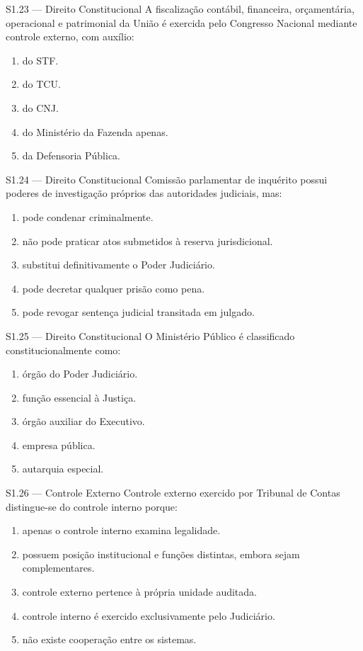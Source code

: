 \begin{questao}{S1.23 — Direito Constitucional}
A fiscalização contábil, financeira, orçamentária, operacional e patrimonial da União é exercida pelo Congresso Nacional mediante controle externo, com auxílio:
\begin{enumerate}[label=\Alph*)]
\item do STF.
\item do TCU.
\item do CNJ.
\item do Ministério da Fazenda apenas.
\item da Defensoria Pública.
\end{enumerate}
\end{questao}

\begin{questao}{S1.24 — Direito Constitucional}
Comissão parlamentar de inquérito possui poderes de investigação próprios das autoridades judiciais, mas:
\begin{enumerate}[label=\Alph*)]
\item pode condenar criminalmente.
\item não pode praticar atos submetidos à reserva jurisdicional.
\item substitui definitivamente o Poder Judiciário.
\item pode decretar qualquer prisão como pena.
\item pode revogar sentença judicial transitada em julgado.
\end{enumerate}
\end{questao}

\begin{questao}{S1.25 — Direito Constitucional}
O Ministério Público é classificado constitucionalmente como:
\begin{enumerate}[label=\Alph*)]
\item órgão do Poder Judiciário.
\item função essencial à Justiça.
\item órgão auxiliar do Executivo.
\item empresa pública.
\item autarquia especial.
\end{enumerate}
\end{questao}

\begin{questao}{S1.26 — Controle Externo}
Controle externo exercido por Tribunal de Contas distingue-se do controle interno porque:
\begin{enumerate}[label=\Alph*)]
\item apenas o controle interno examina legalidade.
\item possuem posição institucional e funções distintas, embora sejam complementares.
\item controle externo pertence à própria unidade auditada.
\item controle interno é exercido exclusivamente pelo Judiciário.
\item não existe cooperação entre os sistemas.
\end{enumerate}
\end{questao}


